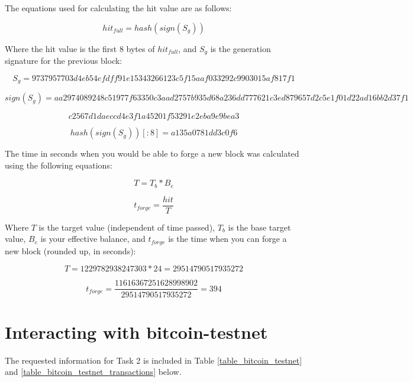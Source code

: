 \documentclass[11pt,a4paper]{article}
\begin{document}
	\noindent The equations used for calculating the hit value are as follows:
	
	\begin{equation}
	hit_{full} = hash(sign(S_g))
	\end{equation}
	
	Where the hit value is the first 8 bytes of $hit_{full}$, and $S_g$ is the generation signature for the previous block:
	
	$$S_g = 9737957703d4eb54efdff91e15343266123c5f15aaf033292c9903015af817f1$$
	
	$$sign(S_g) = aa2974089248c51977f63350c3aad2757b935d68a236dd777621c3ed879657d2c5e1f01d22ad16bb2d37f1$$
	
	\vspace{-2.5em}$$c2567d1daeccd4e3f1a45201f53291e2eba9e9bea3$$
	
	$$hash(sign(S_g))[:8] = a135a0781dd3c0f6$$
	
	\noindent The time in seconds when you would be able to forge a new block was calculated using the following equations:
	
	\begin{equation}
	T = T_b * B_e
	\end{equation}
	
	\begin{equation}
	t_{forge} = \frac{hit}{T}
	\end{equation}
	
	Where $T$ is the target value (independent of time passed), $T_b$ is the base target value, $B_e$ is your effective balance, and $t_{forge}$ is the time when you can forge a new block (rounded up, in seconds):
	
	$$T = 1229782938247303 * 24 = 29514790517935272$$
	
	$$t_{forge} = \frac{11616367251628998902}{29514790517935272} = 394$$
	
	\section{Interacting with bitcoin-testnet}
	
	The requested information for Task 2 is included in Table \ref{table_bitcoin_testnet} and \ref{table_bitcoin_testnet_transactions} below.
	
\end{document}
